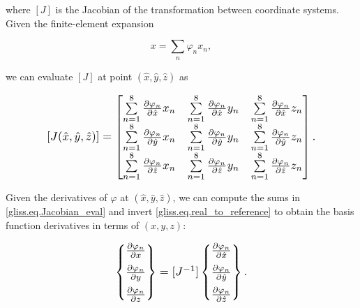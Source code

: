 \noindent
where $[J]$ is the Jacobian of the transformation between coordinate systems.  
Given the finite-element expansion

\begin{equation}
   x = \sum\limits_{n}{{{\varphi }_{n}}{{x}_{n}}},
\end{equation}

\noindent
we can evaluate $[J]$ at point $(\hat{x},\hat{y},\hat{z})$ as

\begin{equation}
  \scalebox{1.2}{
  $
  \label{gliss.eq.Jacobian_eval}
        [J(\hat{x},\hat{y},\hat{z})]=\left[ \begin{matrix}
            \sum\limits_{n=1}^{8}{\frac{\partial {{\varphi }_{n}}}{\partial \hat{x}}{{x}_{n}}} & \sum\limits_{n=1}^{8}{\frac{\partial {{\varphi }_{n}}}{\partial \hat{x}}{{y}_{n}}} & \sum\limits_{n=1}^{8}{\frac{\partial {{\varphi }_{n}}}{\partial \hat{x}}{{z}_{n}}}  \\[6pt]
            \sum\limits_{n=1}^{8}{\frac{\partial {{\varphi }_{n}}}{\partial \hat{y}}{{x}_{n}}} & \sum\limits_{n=1}^{8}{\frac{\partial {{\varphi }_{n}}}{\partial \hat{y}}{{y}_{n}}} & \sum\limits_{n=1}^{8}{\frac{\partial {{\varphi }_{n}}}{\partial \hat{y}}{{z}_{n}}}  \\[6pt]
            \sum\limits_{n=1}^{8}{\frac{\partial {{\varphi }_{n}}}{\partial \hat{z}}{{x}_{n}}} & \sum\limits_{n=1}^{8}{\frac{\partial {{\varphi }_{n}}}{\partial \hat{z}}{{y}_{n}}} & \sum\limits_{n=1}^{8}{\frac{\partial {{\varphi }_{n}}}{\partial \hat{z}}{{z}_{n}}}  \\
          \end{matrix} \right].
        $
        }
\end{equation}

Given the derivatives of $\varphi$ at $(\hat{x},\hat{y},\hat{z})$, we can compute the sums
in \eqref{gliss.eq.Jacobian_eval} and invert \eqref{gliss.eq.real_to_reference} to obtain the 
basis function derivatives in terms of $(x,y,z)$:

\begin{equation}
  \label{gliss.eq.reference_to_real}
  \scalebox{1.2}{
    $
  \left\{ \begin{matrix}
     \frac{\partial {{\varphi }_{n}}}{\partial x}  \\[6pt]
     \frac{\partial {{\varphi }_{n}}}{\partial y}  \\[6pt]
     \frac{\partial {{\varphi }_{n}}}{\partial z}  \\
  \end{matrix} \right\} =
          [J^{-1}]  \left\{ \begin{matrix}
    \frac{\partial {{\varphi }_{n}}}{\partial \hat{x}}  \\[6pt]
    \frac{\partial {{\varphi }_{n}}}{\partial \hat{y}}  \\[6pt]
    \frac{\partial {{\varphi }_{n}}}{\partial \hat{z}}  \\
  \end{matrix} \right\}. 
          $
          }
\end{equation}

